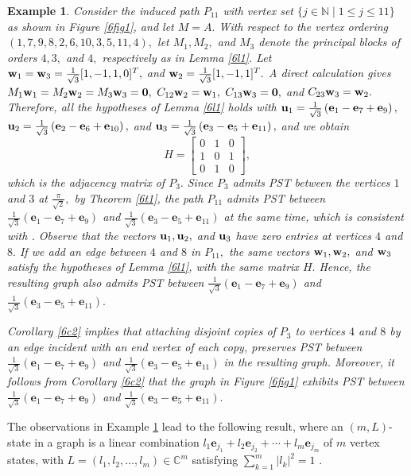 \documentclass[12pt,a4paper]{article}
\newtheorem{exm}{Example}
\def \e {{\bf e}}
\def \u {{\bf u}}
\def \w {{\bf w}}
\def \e {{\mathbf e}}
\newcommand{\ob}[1]{\left(#1\right)}
\begin{document}
\begin{exm}\label{6ex1}
Consider the induced path $P_{11}$ with vertex set $\{j\in\mathbb{N} \mid 1\leq j\leq 11\}$ as shown in Figure \ref{6fig1}, and let $M=A.$ With respect to the vertex ordering $(1,7,9,8,2,6,10,3,5,11,4),$ let $M_1,M_2,$ and $M_3$
denote the principal blocks of orders $4,3,$ and $4,$ respectively as in Lemma \ref{6l1}. Let $\w_1=\w_3=\frac{1}{\sqrt{3}}[1,-1,1,0]^T,$ and $\w_2=\frac{1}{\sqrt{3}}[1,-1,1]^T.$ A direct calculation gives $M_1\w_1=M_2\w_2=M_3\w_3=\mathbf{0},$ $C_{12}\w_2=\w_1,$ $C_{13}\w_3=\mathbf{0},$ and $C_{23}\w_3=\w_2.$ Therefore, all the hypotheses of Lemma \ref{6l1} holds with $\u_1=\frac{1}{\sqrt{3}}\ob{\e_1-\e_7+\e_9},$ $\u_2=\frac{1}{\sqrt{3}}\ob{\e_2-\e_6+\e_{10}},$ and $\u_3=\frac{1}{\sqrt{3}}\ob{\e_3-\e_5+\e_{11}},$ and we obtain 
\[H=\begin{bmatrix}
    0 & 1 & 0\\1 & 0 & 1\\0 & 1 & 0
\end{bmatrix},\]
which is the adjacency matrix of $P_3.$ Since $P_3$ admits PST between the vertices $1$ and $3$ at $\frac{\pi}{\sqrt{2}},$ by Theorem \ref{6t1}, the path $P_{11}$
admits PST between $\frac{1}{\sqrt{3}}\ob{\e_1-\e_7+\e_9}$ and  $\frac{1}{\sqrt{3}}\ob{\e_3-\e_5+\e_{11}}$ at the same time, which is consistent with  \cite[Example 7.3(2)]{god7}. 
Observe that the vectors  $\u_1,\u_2,$ and $\u_3$ have zero entries at vertices $4$ and $8.$ If we add an edge between $4$  and $8$ in $P_{11},$ the same vectors $\w_1,\w_2,$ and $\w_3$ satisfy the hypotheses of Lemma \ref{6l1}, with the same matrix $H.$ Hence, the resulting graph also admits PST between $\frac{1}{\sqrt{3}}\ob{\e_1-\e_7+\e_9}$ and  $\frac{1}{\sqrt{3}}\ob{\e_3-\e_5+\e_{11}}.$


Corollary \ref{6c2} implies that attaching disjoint copies of $P_3$ to vertices $4$ and $8$ by an edge incident with an end vertex of each copy,  preserves PST between
$
\frac{1}{\sqrt{3}}(\e_1-\e_7+\e_9)$
and 
$\frac{1}{\sqrt{3}}(\e_3-\e_5+\e_{11})$
in the resulting graph. Moreover, it follows from Corollary \ref{6c2} that the graph in Figure \ref{6fig1} exhibits PST between $\frac{1}{\sqrt{3}}\ob{\e_1-\e_7+\e_9}$ and  $\frac{1}{\sqrt{3}}\ob{\e_3-\e_5+\e_{11}}.$
\end{exm}
The observations in Example \ref{6ex1} lead to the following result, where an $(m,L)$-state in a graph is a linear combination $l_1\e_{j_1}+l_2\e_{j_2}+\cdots +l_m\e_{j_m}$ of $m$ vertex states, with $L=(l_1,l_2,\ldots,l_m)\in \mathbb{C}^m$ satisfying $\sum_{k=1}^m|l_k|^2=1$ \cite[Section 5]{pal10}.
\end{document}

